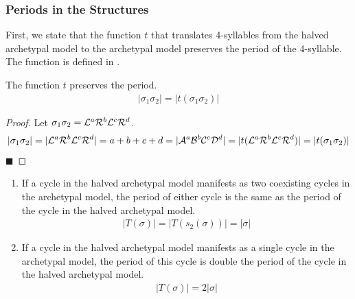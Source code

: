 \subsubsection{Periods in the  Structures}

First, we state that the function $t$ that translates 4-syllables from the halved archetypal model to the archetypal model preserves the period of the 4-syllable.
The function is defined in .

\begin{lemma}
	\label{lemma:t.preserves.period}
	The function $t$ preserves the period.
	\begin{align}
		|\sigma_1\sigma_2| = |t(\sigma_1\sigma_2)|
	\end{align}
\end{lemma}

\begin{proof}
	Let $\sigma_1\sigma_2 = \mathcal{L}^a\mathcal{R}^b\mathcal{L}^c\mathcal{R}^d$.
	\begin{align*}
		|\sigma_1\sigma_2| =  |\mathcal{L}^a\mathcal{R}^b\mathcal{L}^c\mathcal{R}^d|
		= a + b + c + d
		= |\mathcal{A}^a\mathcal{B}^b\mathcal{C}^c\mathcal{D}^d|
		= |t(\mathcal{L}^a\mathcal{R}^b\mathcal{L}^c\mathcal{R}^d)|
		= |t(\sigma_1\sigma_2)|
	\end{align*}
	\hfill $\blacksquare$
\end{proof}

\begin{theorem}
	\label{theorem:period.pal}
	\begin{enumerate}
		\item If a cycle in the halved archetypal model manifests as two coexisting cycles in the archetypal model, the period of either cycle is the same as the period of the cycle in the halved archetypal model.
		      \begin{align}
			      |T(\sigma)| = |T(s_2(\sigma))| = |\sigma|
		      \end{align}
		\item If a cycle in the halved archetypal model manifests as a single cycle in the archetypal model, the period of this cycle is double the period of the cycle in the halved archetypal model.
		      \begin{align}
			      |T(\sigma)| = 2 |\sigma|
		      \end{align}
	\end{enumerate}
\end{theorem}

